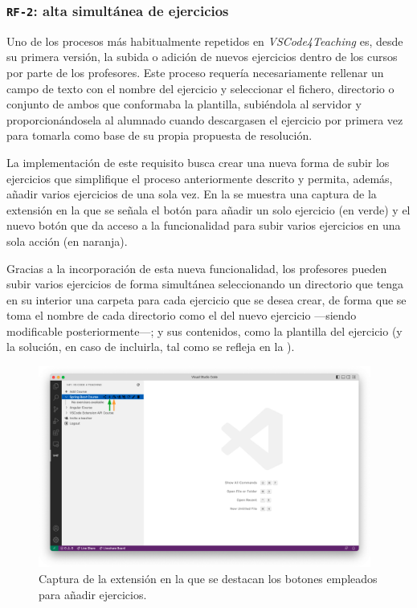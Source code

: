 \subsubsection{\texttt{RF-2}: alta simultánea de ejercicios}
\label{subsec:rf2}

Uno de los procesos más habitualmente repetidos en \textit{VSCode4Teaching} es, desde su primera versión, la subida o adición de nuevos ejercicios dentro de los cursos por parte de los profesores. Este proceso requería necesariamente rellenar un campo de texto con el nombre del ejercicio y seleccionar el fichero, directorio o conjunto de ambos que conformaba la plantilla, subiéndola al servidor y proporcionándosela al alumnado cuando descargasen el ejercicio por primera vez para tomarla como base de su propia propuesta de resolución.

La implementación de este requisito busca crear una nueva forma de subir los ejercicios que simplifique el proceso anteriormente descrito y permita, además, añadir varios ejercicios de una sola vez. En la  se muestra una captura de la extensión en la que se señala el botón para añadir un solo ejercicio (en verde) y el nuevo botón que da acceso a la funcionalidad para subir varios ejercicios en una sola acción (en naranja).

Gracias a la incorporación de esta nueva funcionalidad, los profesores pueden subir varios ejercicios de forma simultánea seleccionando un directorio que tenga en su interior una carpeta para cada ejercicio que se desea crear, de forma que se toma el nombre de cada directorio como el del nuevo ejercicio ---siendo modificable posteriormente---; y sus contenidos, como la plantilla del ejercicio (y la solución, en caso de incluirla, tal como se refleja en la ).

\begin{figure}[ht]
    \centering
    \includegraphics[width=0.975\textwidth]{imagenes/utilizadas/4-3-implementacion/rf2-1.png}
    \caption{Captura de la extensión en la que se destacan los botones empleados para añadir ejercicios.}
    \label{fig:reqf2-1}
\end{figure}
